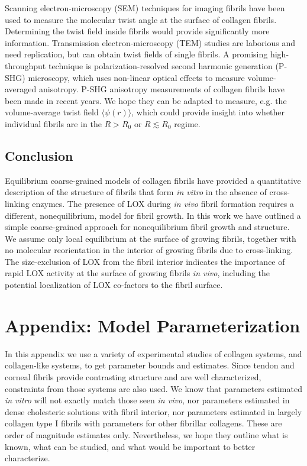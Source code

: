 \documentclass[twoside,twocolumn,9pt]{article}
\begin{document}
Scanning electron-microscopy (SEM) techniques for imaging fibrils have been used to measure the molecular twist angle at the {surface} of collagen fibrils. Determining the twist field {inside} fibrils would provide significantly more information. Transmission electron-microscopy (TEM) studies are laborious and need replication, but can obtain twist fields of single fibrils.\cite{Holmes:2001}  A promising high-throughput technique is polarization-resolved second harmonic generation (P-SHG) microscopy, which uses non-linear optical effects to measure volume-averaged anisotropy. P-SHG anisotropy measurements of collagen fibrils have been made in recent years.\cite{Gusachenko:2012, Rouede:2020} We hope they can be adapted to measure, e.g. the volume-average twist field $\langle \psi(r) \rangle$, which could provide insight into whether individual fibrils are in the $R > R_0$ or $R \lesssim R_0$ regime. 

\subsection{Conclusion} 
Equilibrium coarse-grained models of collagen fibrils have provided a quantitative description of the structure of fibrils that form \textit{in vitro} in the absence of cross-linking enzymes.\cite{Cameron:2020} The presence of LOX during \textit{in vivo} fibril formation requires a different, nonequilibrium, model for fibril growth. In this work we have outlined a simple coarse-grained approach for nonequilibrium fibril growth and structure. We assume only local equilibrium at the surface of growing fibrils, together with no molecular reorientation in the interior of growing fibrils due to cross-linking. The size-exclusion of LOX from the fibril interior indicates the importance of rapid LOX activity at the surface of growing fibrils \emph{in vivo}, including the potential localization of LOX co-factors to the fibril surface.\cite{Rutenberg:2016}

\appendix
\section{Appendix: Model Parameterization}
In this appendix we use a variety of experimental studies of collagen systems, and collagen-like systems, to get parameter bounds and estimates. Since tendon and corneal fibrils provide contrasting structure and are well characterized, constraints from those systems are also used. We know that parameters estimated \emph{in vitro} will not exactly match those seen \emph{in vivo}, nor parameters estimated in dense cholesteric solutions with fibril interior, nor parameters estimated in largely collagen type I fibrils with parameters for other fibrillar collagens. These are order of magnitude estimates only. Nevertheless, we hope they outline what is known, what can be studied, and what would be important to better characterize. 
\end{document}
